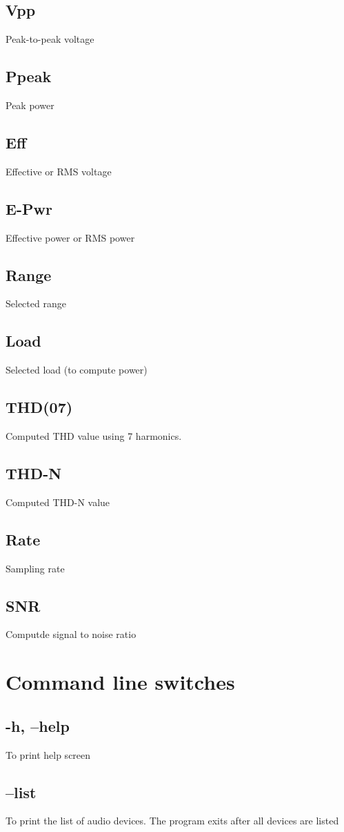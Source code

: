 \documentclass[10pt,a4paper]{article}
\begin{document}
\subsection{Vpp}
Peak-to-peak voltage
\subsection{Ppeak}
Peak power
\subsection{Eff}
Effective or RMS voltage
\subsection{E-Pwr}
Effective power or RMS power
\subsection{Range}
Selected range
\subsection{Load}
Selected load (to compute power)
\subsection{THD(07)}
Computed THD value using 7 harmonics.
\subsection{THD-N}
Computed THD-N value
\subsection{Rate}
Sampling rate
\subsection{SNR}
Computde signal to noise ratio
\section{Command line switches}
\subsection{-h, --help}
To print help screen
\subsection{--list}
To print the list of audio devices. The program exits after all devices are listed
\end{document}
